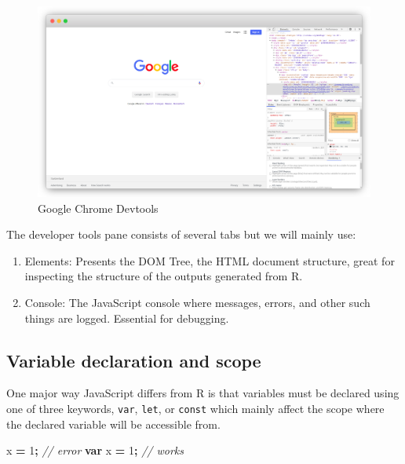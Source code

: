 \documentclass[
]{krantz}
\makeatletter
\newenvironment{Shaded}{\begin{snugshade}}{\end{snugshade}}
\newcommand{\CommentTok}[1]{\textcolor[rgb]{0.37,0.37,0.37}{\textit{#1}}}
\newcommand{\DecValTok}[1]{\textcolor[rgb]{0.06,0.06,0.06}{#1}}
\newcommand{\KeywordTok}[1]{\textcolor[rgb]{0.27,0.27,0.27}{\textbf{#1}}}
\newcommand{\NormalTok}[1]{#1}
\newcommand{\OperatorTok}[1]{\textcolor[rgb]{0.43,0.43,0.43}{\textbf{#1}}}
\providecommand{\tightlist}{%
  \setlength{\itemsep}{0pt}\setlength{\parskip}{0pt}}
\newenvironment{kframe}{%
\medskip{}
\setlength{\fboxsep}{.8em}
 \def\at@end@of@kframe{}%
 \ifinner\ifhmode%
  \def\at@end@of@kframe{\end{minipage}}%
  \begin{minipage}{\columnwidth}%
 \fi\fi%
 \def\FrameCommand##1{\hskip\@totalleftmargin \hskip-\fboxsep
 \colorbox{shadecolor}{##1}\hskip-\fboxsep
     \hskip-\linewidth \hskip-\@totalleftmargin \hskip\columnwidth}%
 \MakeFramed {\advance\hsize-\width
   \@totalleftmargin\z@ \linewidth\hsize
   \@setminipage}}%
 {\par\unskip\endMakeFramed%
 \at@end@of@kframe}
\renewenvironment{Shaded}{\begin{kframe}}{\end{kframe}}
\makeatother
\begin{document}
\begin{figure}
\centering
\includegraphics{images/devtools.png}
\caption{Google Chrome Devtools}
\end{figure}

The developer tools pane consists of several tabs but we will mainly use:

\begin{enumerate}
\def\labelenumi{\arabic{enumi}.}
\tightlist
\item
  Elements: Presents the DOM Tree, the HTML document structure, great for inspecting the structure of the outputs generated from R.
\item
  Console: The JavaScript console where messages, errors, and other such things are logged. Essential for debugging.
\end{enumerate}

\hypertarget{variable-declaration-and-scope}{%
\subsection{Variable declaration and scope}\label{variable-declaration-and-scope}}

One major way JavaScript differs from R is that variables must be declared using one of three keywords, \texttt{var}, \texttt{let}, or \texttt{const} which mainly affect the scope where the declared variable will be accessible from.

\begin{Shaded}
\begin{Highlighting}[]
\NormalTok{x }\OperatorTok{=} \DecValTok{1}\OperatorTok{;} \CommentTok{// error}
\KeywordTok{var}\NormalTok{ x }\OperatorTok{=} \DecValTok{1}\OperatorTok{;} \CommentTok{// works}
\end{Highlighting}
\end{Shaded}
\end{document}
